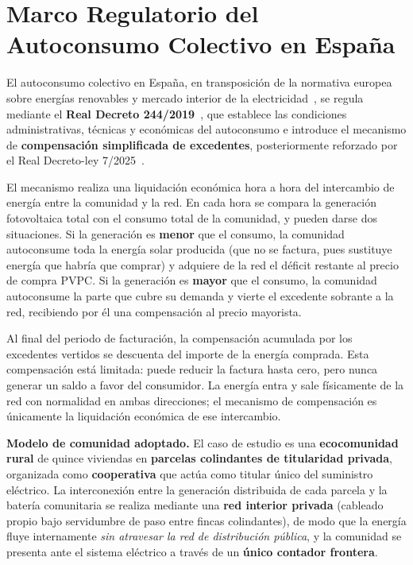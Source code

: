 \documentclass[12pt, a4paper, twoside]{report}
\begin{document}
\section{Marco Regulatorio del Autoconsumo Colectivo en España}
\label{sec:marco_regulatorio}

El autoconsumo colectivo en España, en transposición de la normativa europea
sobre energías renovables y mercado interior de la
electricidad~\citep{Dir2018_2001, Dir2019_944}, se regula
mediante el \textbf{Real Decreto 244/2019}~\citep{RD244_2019}, que establece las condiciones
administrativas, técnicas y económicas del autoconsumo e introduce el mecanismo
de \textbf{compensación simplificada de excedentes}, posteriormente reforzado
por el Real Decreto-ley 7/2025~\citep{RDL7_2025}.

El mecanismo realiza una liquidación económica hora a hora del intercambio de
energía entre la comunidad y la red. En cada hora se compara la generación
fotovoltaica total con el consumo total de la comunidad, y pueden darse dos
situaciones. Si la generación es \textbf{menor} que el consumo, la comunidad
autoconsume toda la energía solar producida (que no se factura, pues sustituye
energía que habría que comprar) y adquiere de la red el déficit restante al
precio de compra PVPC. Si la generación es \textbf{mayor} que el consumo, la
comunidad autoconsume la parte que cubre su demanda y vierte el excedente
sobrante a la red, recibiendo por él una compensación al precio mayorista.

Al final del periodo de facturación, la compensación acumulada por los
excedentes vertidos se descuenta del importe de la energía comprada. Esta
compensación está limitada: puede reducir la factura hasta cero, pero nunca
generar un saldo a favor del consumidor. La energía entra y sale físicamente de
la red con normalidad en ambas direcciones; el mecanismo de compensación es
únicamente la liquidación económica de ese intercambio.

\textbf{Modelo de comunidad adoptado.} El caso de estudio es una
\textbf{ecocomunidad rural} de quince viviendas en \textbf{parcelas colindantes
de titularidad privada}, organizada como \textbf{cooperativa} que actúa como
titular único del suministro eléctrico. La interconexión entre la generación
distribuida de cada parcela y la batería comunitaria se realiza mediante una
\textbf{red interior privada} (cableado propio bajo servidumbre de paso entre
fincas colindantes), de modo que la energía fluye internamente \emph{sin
atravesar la red de distribución pública}, y la comunidad se presenta ante el
sistema eléctrico a través de un \textbf{único contador frontera}.
\end{document}
